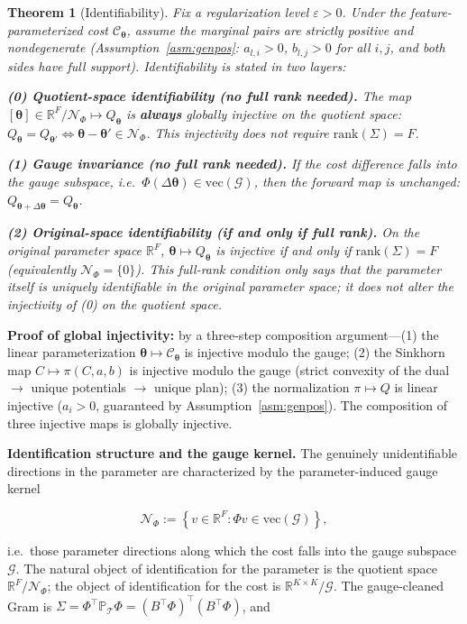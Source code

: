 \documentclass[11pt,a4paper]{article}
\newtheorem{theorem}{Theorem}[section]
\theoremstyle{remark}
\begin{document}
\begin{theorem}[Identifiability]\label{thm:T1}
Fix a regularization level $\varepsilon>0$. Under the feature-parameterized cost
$\mathcal{C}_{\bm{\theta}}$, assume the marginal pairs are strictly positive and
nondegenerate (Assumption~\ref{asm:genpos}: $a_{l,i}>0$, $b_{l,j}>0$ for all $i,j$, and
both sides have full support). Identifiability is stated in two layers:

\textbf{(0) Quotient-space identifiability (no full rank needed).} The map
$[\bm{\theta}]\in\mathbb{R}^F/\mathcal{N}_\Phi\mapsto Q_{\bm{\theta}}$ is \textbf{always}
globally injective on the quotient space:
$Q_{\bm{\theta}}=Q_{\bm{\theta}'}\iff\bm{\theta}-\bm{\theta}'\in\mathcal{N}_\Phi$. This
injectivity does not require $\mathrm{rank}(\Sigma)=F$.

\textbf{(1) Gauge invariance (no full rank needed).} If the cost difference falls into the
gauge subspace, i.e.\ $\Phi(\Delta\bm{\theta})\in\mathrm{vec}(\mathcal{G})$, then the
forward map is unchanged: $Q_{\bm{\theta}+\Delta\bm{\theta}}=Q_{\bm{\theta}}$.

\textbf{(2) Original-space identifiability (if and only if full rank).} On the original
parameter space $\mathbb{R}^F$, $\bm{\theta}\mapsto Q_{\bm{\theta}}$ is injective if and
only if $\mathrm{rank}(\Sigma)=F$ (equivalently $\mathcal{N}_\Phi=\{0\}$). This full-rank
condition only says that the parameter itself is uniquely identifiable in the original
parameter space; it does not alter the injectivity of (0) on the quotient space.
\end{theorem}

\textbf{Proof of global injectivity:} by a three-step composition argument---(1) the linear
parameterization $\bm{\theta}\mapsto\mathcal{C}_{\bm{\theta}}$ is injective modulo the
gauge; (2) the Sinkhorn map $C\mapsto\pi(C,a,b)$ is injective modulo the gauge (strict
convexity of the dual $\to$ unique potentials $\to$ unique plan); (3) the normalization
$\pi\mapsto Q$ is linear injective ($a_i>0$, guaranteed by Assumption~\ref{asm:genpos}).
The composition of three injective maps is globally injective.

\textbf{Identification structure and the gauge kernel.} The genuinely unidentifiable
directions in the parameter are characterized by the parameter-induced gauge kernel

\[
\mathcal{N}_\Phi:=\left\{v\in\mathbb{R}^F:\Phi v\in\mathrm{vec}(\mathcal{G})\right\},
\]

i.e.\ those parameter directions along which the cost falls into the gauge subspace
$\mathcal{G}$. The natural object of identification for the parameter is the quotient space
$\mathbb{R}^F/\mathcal{N}_\Phi$; the object of identification for the cost is
$\mathbb{R}^{K\times K}/\mathcal{G}$. The gauge-cleaned Gram is
$\Sigma=\Phi^{\top}\mathbb{P}_{\mathcal{T}}\Phi=(B^{\top}\Phi)^{\top}(B^{\top}\Phi)$, and
\end{document}
